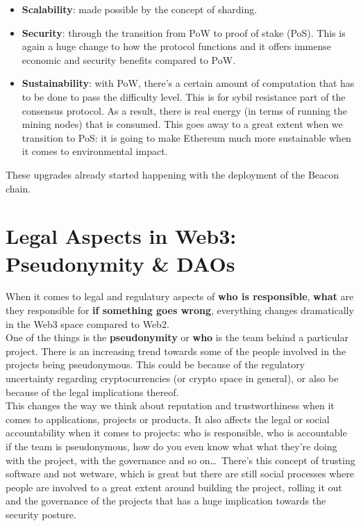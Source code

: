 \begin{itemize}

    \item\textbf{Scalability}: made possible by the concept of sharding.

    \item\textbf{Security}: through the transition from PoW to proof of stake (PoS).
    This is again a huge change to how the protocol functions and it offers immense economic and security benefits compared to PoW.

    \item\textbf{Sustainability}: with PoW, there's a certain amount of computation that has to be done to pass the difficulty level.
    This is for sybil resistance part of the consensus protocol.
    As a result, there is real energy (in terms of running the mining nodes) that is consumed.
    This goes away to a great extent when we transition to PoS: it is going to make Ethereum much more sustainable when it comes to environmental impact.

\end{itemize}

These upgrades already started happening with the deployment of the Beacon chain.

\section{Legal Aspects in Web3: Pseudonymity \& DAOs}

When it comes to legal and regulatury aspects of \textbf{who is responsible}, \textbf{what} are they responsible for \textbf{if something goes wrong}, everything changes dramatically in the Web3 space compared to Web2.\\

One of the things is the \textbf{pseudonymity} or \textbf{who} is the team behind a particular project.
There is an increasing trend towards some of the people involved in the projects being pseudonymous.
This could be because of the regulatory uncertainty regarding cryptocurrencies (or crypto space in general), or
also be because of the legal implications thereof.\\

This changes the way we think about reputation and trustworthiness when it comes to applications, projects or products.
It also affects the legal or social accountability when it comes to projects: who is responsible, who is accountable if the team is pseudonymous, how do you even know what what they're doing with the project, with the governance and so on\dots\,
There's this concept of trusting software and not wetware, which is great but there are still social processes where people are involved to a great extent around building the project, rolling it out and the governance of the projects that has a huge implication towards the security posture.\\

